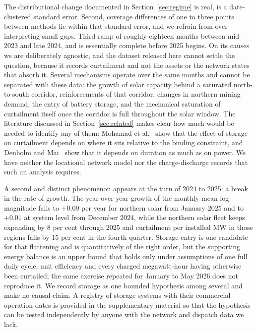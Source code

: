 \documentclass[preprint,3p,times]{elsarticle}
\providecommand{\DIFaddtex}[1]{{\protect\color{blue} \sf #1}} %
\providecommand{\DIFdeltex}[1]{{\protect\color{red} \scriptsize #1}} %
\providecommand{\DIFaddbegin}{} %
\providecommand{\DIFaddend}{} %
\providecommand{\DIFdelbegin}{} %
\providecommand{\DIFdelend}{} %
\providecommand{\DIFadd}[1]{\texorpdfstring{\DIFaddtex{#1}}{#1}} %
\providecommand{\DIFdel}[1]{\texorpdfstring{\DIFdeltex{#1}}{}} %
\begin{document}
\DIFadd{The distributional change documented in Section~\ref{sec:regime} is real, is }\DIFaddend a \DIFdelbegin \DIFdel{date-clustered standard error.
Second, coverage differences of one to three points between methods lie within that standard error, and we refrain from over-interpreting small gaps. Third}\DIFdelend \DIFaddbegin \DIFadd{ramp of roughly eighteen months between mid-2023 and late 2024, and is essentially complete before 2025 begins. On its causes we are deliberately agnostic, and the dataset released here cannot settle the question, because it records curtailment and not the assets or the network states that absorb it. Several mechanisms operate over the same months and cannot be separated with these data: the growth of solar capacity behind a saturated north-to-south corridor, reinforcements of that corridor, changes in northern mining demand, the entry of battery storage, and the mechanical saturation of curtailment itself once the corridor is full throughout the solar window. The literature discussed in Section~\ref{sec:related} makes clear how much would be needed to identify any of them: Mohamad et al.~\cite{mohamad2021} show that the effect of storage on curtailment depends on where it sits relative to the binding constraint, and Denholm and Mai~\cite{denholm2019} show that it depends on duration as much as on power. We have neither the locational network model nor the charge-discharge records that such an analysis requires.
}

\DIFadd{A second and distinct phenomenon appears at the turn of 2024 to 2025: a break in the rate of growth. The year-over-year growth of the monthly mean log-magnitude falls to $+0.09$ per year for northern solar from January 2025 and to $+0.01$ at system level from December 2024, while the northern solar fleet keeps expanding by 8 per cent through 2025 and curtailment per installed MW in those regions falls by 15 per cent in the fourth quarter. Storage entry is one candidate for that flattening and is quantitatively of the right order, but the supporting energy balance is an upper bound that holds only under assumptions of one full daily cycle, unit efficiency and every charged megawatt-hour having otherwise been curtailed; the same exercise repeated for January to May 2026 does not reproduce it. We record storage as one bounded hypothesis among several and make no causal claim. A registry of storage systems with their commercial operation dates is provided in the supplementary material so that the hypothesis can be tested independently by anyone with the network and dispatch data we lack.
}
\end{document}

